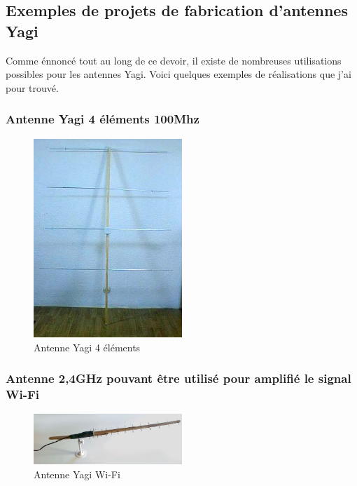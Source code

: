 \documentclass[12pt, a4paper]{article}
\begin{document}
\newpage
\subsection{Exemples de projets de fabrication d'antennes Yagi}
Comme énnoncé tout au long de ce devoir, il existe
de nombreuses utilisations possibles pour les antennes 
Yagi. Voici quelques exemples de réalisations que 
j'ai pour trouvé. 
\subsubsection*{Antenne Yagi 4 éléments 100Mhz}
\begin{figure}[h]
    \centering
    \includegraphics[width=0.5\textwidth]{img/antenne-4.jpg}
    \caption{Antenne Yagi 4 éléments \cite{r6}}
    \label{fig:antenn}
\end{figure}

\subsubsection*{Antenne 2,4GHz pouvant être utilisé pour amplifié le signal Wi-Fi}
\begin{figure}[h]
    \centering
    \includegraphics[width=0.5\textwidth]{img/ant-wifi.jpg}
    \caption{Antenne Yagi Wi-Fi \cite{r7}}
    \label{fig:wifi}
\end{figure}
\end{document}
